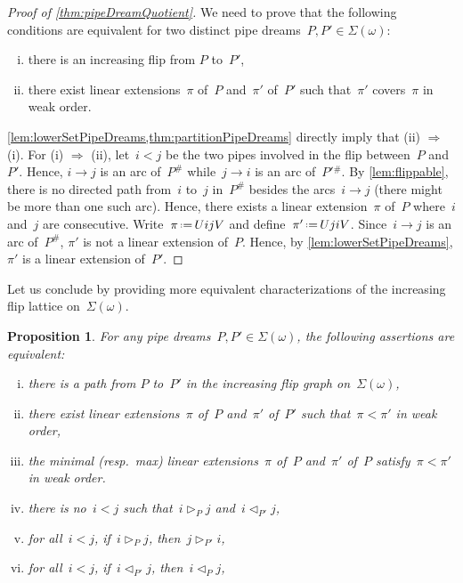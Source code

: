 \documentclass[reqno]{amsart}
\newtheorem{proposition}[theorem]{Proposition}
\theoremstyle{definition}
\newcommand{\eqdef}{\mbox{\,\raisebox{0.2ex}{\scriptsize\ensuremath{\mathrm:}}\ensuremath{=}\,}} %
\newcommand{\contact}{^\#} %
\newcommand{\acyclicPipeDreams}{\Sigma} %
\newcommand{\less}{\vartriangleleft} %
\newcommand{\more}{\vartriangleright} %
\newcommand{\contactLess}[1]{\less_{#1}} %
\newcommand{\contactMore}[1]{\more_{#1}} %
\begin{document}
\begin{proof}[Proof of \cref{thm:pipeDreamQuotient}]
We need to prove that the following conditions are equivalent for two distinct pipe dreams~$P,P' \in \acyclicPipeDreams(\omega)$:
\begin{enumerate}[(i)]
\item there is an increasing flip from $P$ to~$P'$,
\item there exist linear extensions~$\pi$ of~$P$ and~$\pi'$ of~$P'$ such that~$\pi'$ covers~$\pi$ in weak order.
\end{enumerate}
\cref{lem:lowerSetPipeDreams,thm:partitionPipeDreams} directly imply that (ii) $\Rightarrow$ (i).
For (i) $\Rightarrow$ (ii), let~$i < j$ be the two pipes involved in the flip between~$P$ and~$P'$.
Hence, $i \to j$ is an arc of~$P\contact$ while~$j \to i$ is an arc of~$P'{}\contact$.
By \cref{lem:flippable}, there is no directed path from~$i$ to~$j$ in~$P\contact$ besides the arcs~$i \to j$ (there might be more than one such arc).
Hence, there exists a linear extension~$\pi$ of~$P$ where~$i$ and~$j$ are consecutive.
Write~$\pi \eqdef UijV$ and define~$\pi' \eqdef UjiV$.
Since~$i \to j$ is an arc of~$P\contact$, $\pi'$ is not a linear extension of~$P$.
Hence, by \cref{lem:lowerSetPipeDreams}, $\pi'$ is a linear extension of~$P'$.
\end{proof}

Let us conclude by providing more equivalent characterizations of the increasing flip lattice on~$\acyclicPipeDreams(\omega)$.

\begin{proposition}
For any pipe dreams~$P, P' \in \acyclicPipeDreams(\omega)$, the following assertions are equivalent:
\begin{enumerate}[(i)]
\item there is a path from $P$ to~$P'$ in the increasing flip graph on~$\acyclicPipeDreams(\omega)$,
\item there exist linear extensions~$\pi$ of~$P$ and~$\pi'$ of~$P'$ such that~$\pi < \pi'$ in weak order,
\item the minimal (resp.~max) linear extensions~$\pi$ of~$P$ and~$\pi'$ of~$P$ satisfy~$\pi < \pi'$ in weak order.
\item there is no~$i < j$ such that~$i \contactMore{P} j$ and~$i \contactLess{P'} j$,
\item for all~$i < j$, if~$i \contactMore{P} j$, then~$j \contactMore{P'} i$,
\item for all~$i < j$, if~$i \contactLess{P'} j$, then~$i \contactLess{P} j$,
\end{enumerate}
\end{proposition}
\end{document}
